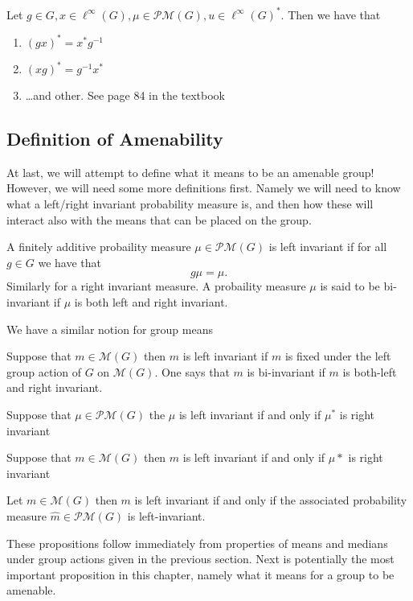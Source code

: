 \begin{propn}
  Let $g \in G, x \in \ell^{\infty}(G), \mu \in \mathcal{PM}(G), u \in
  \ell^{\infty}(G)^{*}$. Then we have that 
  \begin{enumerate}
    \item $(gx)^{*} = x^{*}g^{-1}$
    \item $(xg)^{*} = g^{-1}x^{*}$ 
    \item \ldots and other. See page 84 in the textbook
  \end{enumerate}
\end{propn}

\subsection{Definition of Amenability}%
\label{sub:Definition of Amenability}

At last, we will attempt to define what it means to be an amenable group!
However, we will need some more definitions first. Namely we will need to know
what a left/right invariant probability measure is, and then how these will
interact also with the means that can be placed on the group.

\begin{defn}
  A finitely additive probaility measure $\mu \in \mathcal{PM}(G)$ is left
  invariant if for all $g \in G$ we have that
  \[
  g\mu = \mu
  .\] 
  Similarly for a right invariant measure. A probaility measure $\mu$ is said
  to be bi-invariant if $\mu$ is both left and right invariant.
\end{defn}

We have a similar notion for group means
\begin{defn}
  Suppose that $m \in \mathcal{M}(G)$ then $m$ is left invariant if $m$ is
  fixed under the left group action of $G$ on $\mathcal{M}(G)$. One says that
  $m$ is bi-invariant if $m$ is both-left and right invariant.
\end{defn}

\begin{propn}
  Suppose that $\mu \in \mathcal{PM}(G)$ the $\mu$ is left invariant if and
  only if $\mu^{*}$ is right invariant
\end{propn}

\begin{propn}
  Suppose that $m \in \mathcal{M}(G)$ then $m$ is left invariant if and only if
  $\mu*$ is right invariant
\end{propn}

\begin{propn}
  Let $m \in \mathcal{M}(G)$ then $m$ is left invariant if and only if the
  associated probability measure $\hat{m} \in \mathcal{PM}(G)$ is left-invariant.
\end{propn}
These propositions follow immediately from properties of means and medians
under group actions given in the previous section. Next is potentially the most
important proposition in this chapter, namely what it means for a group to be
amenable.

